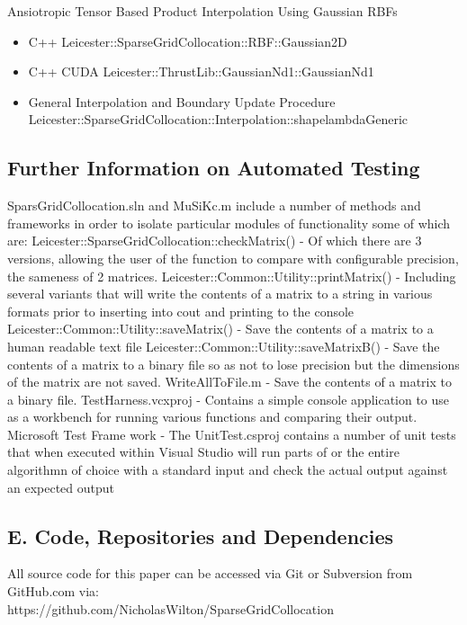 \documentclass[a4paper]{amsart}
\begin{document}
Ansiotropic Tensor Based Product Interpolation Using Gaussian RBFs
\begin{itemize}
\item C++ Leicester::SparseGridCollocation::RBF::Gaussian2D
\item C++ CUDA  Leicester::ThrustLib::GaussianNd1::GaussianNd1
\item General Interpolation and Boundary Update Procedure Leicester::SparseGridCollocation::Interpolation::shapelambdaGeneric
\end{itemize}

\subsection{ Further Information on Automated Testing}

SparsGridCollocation.sln and MuSiKc.m include a number of methods and frameworks in order to isolate particular modules of functionality some of which are:
Leicester::SparseGridCollocation::checkMatrix() - Of which there are 3 versions, allowing the user of the function to compare with configurable precision, the sameness of 2 matrices.
Leicester::Common::Utility::printMatrix() - Including several variants that will write the contents of a matrix to a string in various formats prior to inserting into cout and printing to the console
Leicester::Common::Utility::saveMatrix() - Save the contents of a matrix to a human readable text file
Leicester::Common::Utility::saveMatrixB() - Save the contents of a matrix to a binary file so as not to lose precision but the dimensions of the matrix are not saved.
WriteAllToFile.m - Save the contents of a matrix to a binary file.
TestHarness.vcxproj - Contains a simple console application to use as a workbench for running various functions and comparing their output.
Microsoft Test Frame work -  The UnitTest.csproj contains a number of unit tests that when executed within Visual Studio will run parts of or the entire algorithmn of choice with a standard input and check the actual output against an expected output

\subsection{E. Code, Repositories and Dependencies}

All source code for this paper can be accessed via Git or Subversion from GitHub.com via:\\
https://github.com/NicholasWilton/SparseGridCollocation\\
\end{document}
